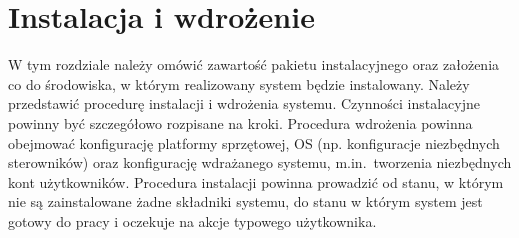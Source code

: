 \chapter{Instalacja i wdrożenie}
\thispagestyle{chapterBeginStyle}

W tym rozdziale należy omówić zawartość pakietu instalacyjnego oraz założenia co do środowiska, w którym realizowany system będzie instalowany. Należy przedstawić procedurę instalacji i wdrożenia systemu. Czynności instalacyjne powinny być szczegółowo rozpisane na kroki. Procedura wdrożenia powinna obejmować konfigurację platformy sprzętowej, OS (np. konfiguracje niezbędnych sterowników) oraz konfigurację wdrażanego systemu, m.in.\ tworzenia niezbędnych kont użytkowników. Procedura instalacji powinna prowadzić od stanu, w którym nie są zainstalowane żadne składniki systemu, do stanu w którym system jest gotowy do pracy i oczekuje na akcje typowego użytkownika.

